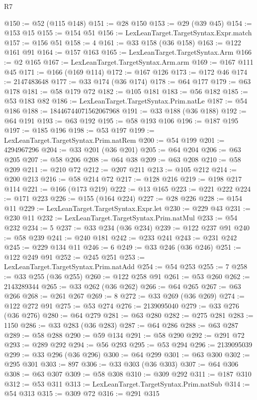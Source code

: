 \begin{lexlean}{R7}
\begin{coremodule}
@150 := @52 (@115 @148)
@151 := @28 @150
@153 := @29 (@39 @45)
@154 := @153 @15
@155 := @154 @51
@156 := LexLeanTarget.TargetSyntax.Expr.match
@157 := @156 @51
@158 := 4
@161 := @33 @158 (@36 @158)
@163 := @122 @161 @91
@164 := @157 @163
@165 := LexLeanTarget.TargetSyntax.Arm
@166 := @2 @165
@167 := LexLeanTarget.TargetSyntax.Arm.arm
@169 := @167 @111 @45
@171 := @166 (@169 @114)
@172 := @167 @126
@173 := @172 @46
@174 := 2147483648
@177 := @33 @174 (@36 @174)
@178 := @64 @177
@179 := @63 @178
@181 := @58 @179 @72
@182 := @105 @181
@183 := @56 @182
@185 := @53 @183 @82
@186 := LexLeanTarget.TargetSyntax.Prim.natLe
@187 := @54 @186
@188 := 18446744071562067968
@191 := @33 @188 (@36 @188)
@192 := @64 @191
@193 := @63 @192
@195 := @58 @193 @106
@196 := @187 @195
@197 := @185 @196
@198 := @53 @197
@199 := LexLeanTarget.TargetSyntax.Prim.natRem
@200 := @54 @199
@201 := 4294967296
@204 := @33 @201 (@36 @201)
@205 := @64 @204
@206 := @63 @205
@207 := @58 @206
@208 := @64 @38
@209 := @63 @208
@210 := @58 @209
@211 := @210 @72
@212 := @207 @211
@213 := @105 @212
@214 := @200 @213
@216 := @58 @214 @72
@217 := @128 @216
@219 := @198 @217 @114
@221 := @166 (@173 @219)
@222 := @13 @165
@223 := @221 @222
@224 := @171 @223
@226 := @155 (@164 @224)
@227 := @28 @226
@228 := @154 @11
@229 := LexLeanTarget.TargetSyntax.Expr.let
@230 := @229 @43
@231 := @230 @11
@232 := LexLeanTarget.TargetSyntax.Prim.natMul
@233 := @54 @232
@234 := 5
@237 := @33 @234 (@36 @234)
@239 := @122 @237 @91
@240 := @58 @239
@241 := @240 @181
@242 := @233 @241
@243 := @231 @242
@245 := @229 @134 @11
@246 := 6
@249 := @33 @246 (@36 @246)
@251 := @122 @249 @91
@252 := @245 @251
@253 := LexLeanTarget.TargetSyntax.Prim.natAdd
@254 := @54 @253
@255 := 7
@258 := @33 @255 (@36 @255)
@260 := @122 @258 @91
@261 := @53 @260
@262 := 2143289344
@265 := @33 @262 (@36 @262)
@266 := @64 @265
@267 := @63 @266
@268 := @261 @267
@269 := 8
@272 := @33 @269 (@36 @269)
@274 := @122 @272 @91
@275 := @53 @274
@276 := 2139095040
@279 := @33 @276 (@36 @276)
@280 := @64 @279
@281 := @63 @280
@282 := @275 @281
@283 := 1150
@286 := @33 @283 (@36 @283)
@287 := @64 @286
@288 := @63 @287
@289 := @58 @288
@290 := @59 @134
@291 := @58 @290
@292 := @291 @72
@293 := @289 @292
@294 := @56 @293
@295 := @53 @294
@296 := 2139095039
@299 := @33 @296 (@36 @296)
@300 := @64 @299
@301 := @63 @300
@302 := @295 @301
@303 := 897
@306 := @33 @303 (@36 @303)
@307 := @64 @306
@308 := @63 @307
@309 := @58 @308
@310 := @309 @292
@311 := @187 @310
@312 := @53 @311
@313 := LexLeanTarget.TargetSyntax.Prim.natSub
@314 := @54 @313
@315 := @309 @72
@316 := @291 @315

\end{coremodule}
\end{lexlean}
